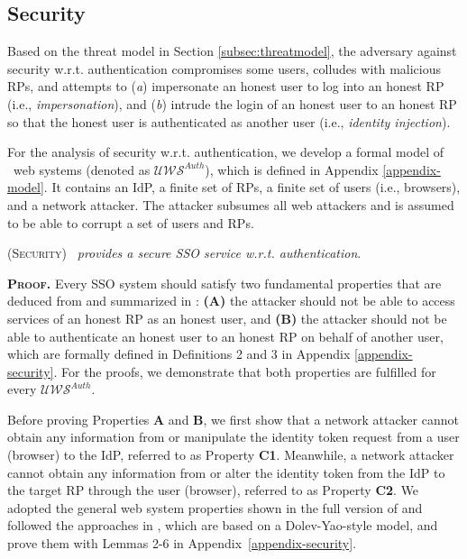 \subsection{Security}
\label{analysis-security}

\newc
Based on the threat model in Section \ref{subsec:threatmodel}, the adversary against security w.r.t. authentication \cite{FettKS14,BrowserID,SPRESSO} compromises some users, colludes with malicious RPs, and attempts to (\emph{a}) impersonate an honest user to log into an honest RP (i.e., \emph{impersonation}), and (\emph{b}) intrude the login of an honest user to an honest RP so that the honest user is authenticated as another user (i.e., \emph{identity injection}). 


For the analysis of security w.r.t. authentication, we develop a formal model of \usso\ web systems (denoted as $\mathcal{U\!W\!S}^{Auth}$), which is defined in Appendix \ref{appendix-model}. It contains an IdP, a finite set of RPs, a finite set of users (i.e., browsers), and a network attacker. The attacker subsumes all web attackers and is assumed to be able to  corrupt a set of users and RPs.


\begin{thm}
\textsc{(Security)} \emph{\usso\ provides a secure SSO service w.r.t. authentication}.
\label{thm-security}
\end{thm}

\noindent\textbf{\textsc{Proof.}} Every SSO system should satisfy two fundamental properties that are deduced from \cite{FettKS14} and summarized in \cite{BrowserID,SPRESSO}: {\bf (A)} the attacker should not be able to access services of an honest RP as an honest user, and {\bf (B)} the attacker should not be able to authenticate an honest user to an honest RP on behalf of another user, which are formally defined in Definitions 2 and 3 in Appendix \ref{appendix-security}. For the proofs, we demonstrate that both properties are fulfilled for every $\mathcal{UWS}^{Auth}$. 

Before proving Properties {\bf A} and {\bf B}, we first show that a network attacker cannot obtain any information from or manipulate the identity token request from a user (browser) to the IdP, referred to as Property {\bf C1}. Meanwhile, a network attacker cannot obtain any information from or alter the identity token from the IdP to the target RP through the user (browser), referred to as Property {\bf C2}. We adopted the general web system properties shown in the full version of \cite{FettKS14} and followed the approaches in \cite{BrowserID,SPRESSO}, which are based on a Dolev-Yao-style model, and prove them with Lemmas 2-6 in Appendix~\ref{appendix-security}. 

